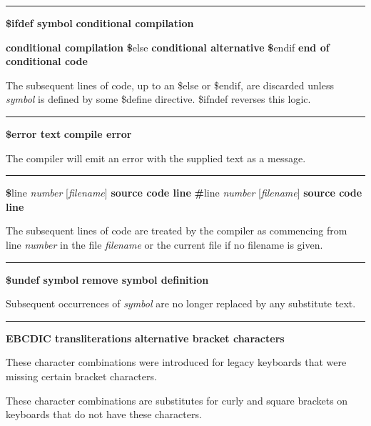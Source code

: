 \bigskip\hrule\vspace{0.1cm}
\noindent
{\bf \$ifdef symbol } \hfill {\bf conditional compilation}

\noindent
{} \hfill {\bf conditional compilation}
\linebreak
{\textbf \$else } \hfill {\bf conditional alternative}
\linebreak
{\textbf \$endif } \hfill {\bf end of conditional code}

The subsequent lines of code, up to an \$else or \$endif, are discarded
unless \textit{symbol} is defined by some \$define directive. \$ifndef
reverses this logic.

\bigskip\hrule\vspace{0.1cm}
\noindent
{\bf \$error text } \hfill {\bf compile error}

\noindent
{}The compiler will emit an error with the
supplied text as a message.


\bigskip\hrule\vspace{0.1cm}
\noindent
{\textbf \$line \textit{number} [\textit{filename}] } \hfill {\bf source code line}
{\textbf \#line \textit{number} [\textit{filename}] } \hfill {\bf source code line}

\noindent
The subsequent lines of code are treated by the compiler as commencing
from line \textit{number} in the file \textit{filename} or the current
file if no filename is given.

\bigskip\hrule\vspace{0.1cm}
\noindent
{\bf \$undef symbol } \hfill {\bf remove symbol definition}

\noindent
{}Subsequent occurrences of \textit{symbol} are no longer
replaced by any substitute text.

\bigskip\hrule\vspace{0.1cm}
\noindent
{\bf EBCDIC transliterations } \hfill {\bf alternative bracket characters}

\noindent
These character combinations were introduced for legacy keyboards that
were missing certain bracket characters.


These character combinations are substitutes for curly and square
brackets on keyboards that do not have these characters.

